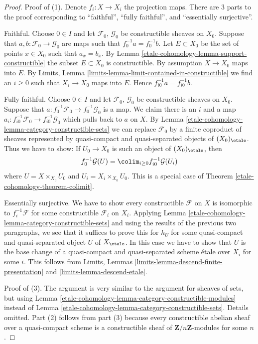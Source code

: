 \begin{proof}
Proof of (1). Denote $f_i : X \to X_i$ the projection maps.
There are 3 parts to the proof corresponding to ``faithful'',
``fully faithful'', and ``essentially surjective''.

\medskip\noindent
Faithful. Choose $0 \in I$ and let $\mathcal{F}_0$, $\mathcal{G}_0$ be
constructible sheaves on $X_0$. Suppose that
$a, b : \mathcal{F}_0 \to \mathcal{G}_0$ are maps such that
$f_0^{-1}a = f_0^{-1}b$. Let $E \subset X_0$ be the set
of points $x \in X_0$ such that $a_{\overline{x}} = b_{\overline{x}}$.
By Lemma \ref{etale-cohomology-lemma-support-constructible} the subset
$E \subset X_0$ is constructible. By assumption $X \to X_0$ maps into $E$.
By Limits, Lemma \ref{limits-lemma-limit-contained-in-constructible}
we find an $i \geq 0$ such that $X_i \to X_0$ maps into $E$.
Hence $f_{i0}^{-1}a = f_{i0}^{-1}b$.

\medskip\noindent
Fully faithful. Choose $0 \in I$ and let $\mathcal{F}_0$, $\mathcal{G}_0$ be
constructible sheaves on $X_0$. Suppose that
$a : f_0^{-1}\mathcal{F}_0 \to f_0^{-1}\mathcal{G}_0$ is a map.
We claim there is an $i$ and a map
$a_i : f_{i0}^{-1}\mathcal{F}_0 \to f_{i0}^{-1}\mathcal{G}_0$
which pulls back to $a$ on $X$.
By Lemma \ref{etale-cohomology-lemma-category-constructible-sets}
we can replace $\mathcal{F}_0$
by a finite coproduct of sheaves represented by quasi-compact
and quasi-separated objects of $(X_0)_\etale$.
Thus we have to show: If $U_0 \to X_0$ is such an object
of $(X_0)_\etale$, then
$$
f_0^{-1}\mathcal{G}(U) = \colim_{i \geq 0} f_{i0}^{-1}\mathcal{G}(U_i)
$$
where $U = X \times_{X_0} U_0$ and $U_i = X_i \times_{X_0} U_0$.
This is a special case of Theorem \ref{etale-cohomology-theorem-colimit}.

\medskip\noindent
Essentially surjective. We have to show every constructible $\mathcal{F}$
on $X$ is isomorphic to $f_i^{-1}\mathcal{F}$ for some constructible
$\mathcal{F}_i$ on $X_i$. Applying
Lemma \ref{etale-cohomology-lemma-category-constructible-sets}
and using the results of the previous two paragraphs, we see that
it suffices to prove this for $h_U$ for some quasi-compact
and quasi-separated object $U$ of $X_\etale$.
In this case we have to show that $U$ is the base change of
a quasi-compact and quasi-separated scheme \'etale over $X_i$ for some $i$.
This follows from
Limits, Lemmas \ref{limits-lemma-descend-finite-presentation} and
\ref{limits-lemma-descend-etale}.

\medskip\noindent
Proof of (3). The argument is very similar to the argument for
sheaves of sets, but using
Lemma \ref{etale-cohomology-lemma-category-constructible-modules}
instead of
Lemma \ref{etale-cohomology-lemma-category-constructible-sets}. Details omitted.
Part (2) follows from part (3) because every constructible abelian
sheaf over a quasi-compact scheme is a constructible sheaf of
$\mathbf{Z}/n\mathbf{Z}$-modules for some $n$.
\end{proof}

